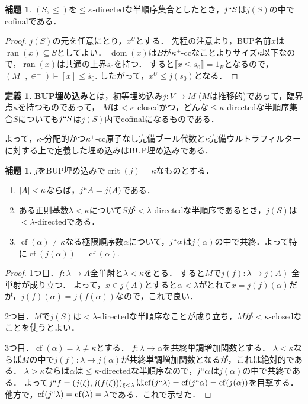 \documentclass[uplatex,dvipdfmx]{jsarticle}
\newcommand{\range}{\operatorname{ran}}
\newcommand{\dom}{\operatorname{dom}}
\newcommand{\cf}{\operatorname{cf}}
\newcommand{\crit}{\operatorname{crit}}
\DeclarePairedDelimiter\abs{\lvert}{\rvert}
\newcommand{\truth}[1]{\llbracket #1 \rrbracket}
\renewcommand\subset{\subseteq}
\theoremstyle{definition}
\newtheorem{defi}[thm]{定義}
\newtheorem{lem}[thm]{補題}
\begin{document}
	\begin{lem}
		$(S, \le)$を${\le} \kappa$-directedな半順序集合としたとき，$j``S$は$j(S)$の中でcofinalである．
	\end{lem}
	\begin{proof}
		$j(S)$の元を任意にとり，$x^U$とする．
		先程の注意より，BUP名前$x$は$\range(x) \subset S$としてよい．
		$\dom(x)$は$B$が$\kappa^+$-ccなことよりサイズ$\kappa$以下なので，$\range(x)$は共通の上界$s_0$を持つ．
		すると$\truth{x \le s_0} = 1_B$となるので，$(M^-, \in^-) \models [x] \le \check{s_0}$.
		したがって，$x^U \le j(s_0)$となる．
	\end{proof}

	\begin{defi}
		\textbf{BUP埋め込み}とは，初等埋め込み$j \colon V \to M$ ($M$は推移的)であって，臨界点$\kappa$を持つものであって，
		$M$は${<}\kappa$-closedかつ，どんな${\le}\kappa$-directedな半順序集合$S$についても$j``S$は$j(S)$内でcofinalになるものである．
	\end{defi}

	よって，$\kappa$-分配的かつ$\kappa^+$-cc原子なし完備ブール代数と$\kappa$完備ウルトラフィルターに対する上で定義した埋め込みはBUP埋め込みである．

	\begin{lem}
		$j$をBUP埋め込みで$\crit(j) = \kappa$なものとする．
		\begin{enumerate}
			\item $\abs{A} < \kappa$ならば，$j``A = j(A)$である．
			\item ある正則基数$\lambda < \kappa$について$S$が${<}\lambda$-directedな半順序であるとき，$j(S)$は${<}\lambda$-directedである．
			\item $\cf(\alpha) \ne \kappa$なる極限順序数$\alpha$について，$j``\alpha$は$j(\alpha)$の中で共終．よって特に$\cf(j(\alpha)) = \cf(\alpha)$.
		\end{enumerate}
	\end{lem}
	\begin{proof}
		1つ目．$f \colon \lambda \to A$全単射と$\lambda < \kappa$をとる．
		すると$M$で$j(f) \colon \lambda \to j(A)$ 全単射が成り立つ．
		よって，$x \in j(A)$とすると$\alpha < \lambda$がとれて$x = j(f)(\alpha)$だが，$j(f)(\alpha) = j(f(\alpha))$なので，これで良い．

		2つ目．$M$で$j(S)$は${<}\lambda$-directedな半順序なことが成り立ち，$M$が${<}\kappa$-closedなことを使うとよい．

		3つ目．$\cf(\alpha) = \lambda \ne \kappa$とする．
		$f \colon \lambda \to \alpha$を共終単調増加関数とする．
		$\lambda < \kappa$ならば$M$の中で$j(f) \colon \lambda \to j(\alpha)$が共終単調増加関数となるが，これは絶対的である．
		$\lambda > \kappa$ならば$\alpha$は${\le}\kappa$-directedな半順序なので，$j``\alpha$は$j(\alpha)$の中で共終である．
		よって$j``f = (j(\xi), j(f(\xi)))_{\xi < \lambda}$は$\cf(j`` \lambda) = \cf(j `` \alpha) = \cf(j(\alpha))$を目撃する．
		他方で，$\cf(j``\lambda) = \cf(\lambda) = \lambda$である．これで示せた．
	\end{proof}
\end{document}
